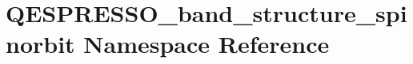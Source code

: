 \hypertarget{namespace_q_e_s_p_r_e_s_s_o__band__structure__spinorbit}{\section{Q\+E\+S\+P\+R\+E\+S\+S\+O\+\_\+band\+\_\+structure\+\_\+spinorbit Namespace Reference}
\label{namespace_q_e_s_p_r_e_s_s_o__band__structure__spinorbit}
}
